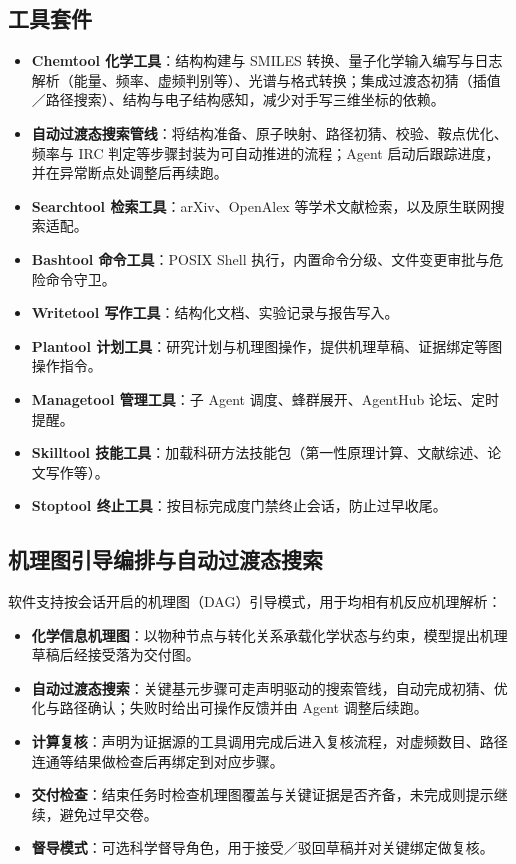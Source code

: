 \documentclass[zihao=-4,a4paper,fontset=none]{ctexart}
\begin{document}
\subsection{工具套件}
\begin{itemize}[itemsep=2pt]
  \item \textbf{Chemtool 化学工具}：结构构建与 SMILES 转换、量子化学输入编写与日志解析（能量、频率、虚频判别等）、光谱与格式转换；集成过渡态初猜（插值／路径搜索）、结构与电子结构感知，减少对手写三维坐标的依赖。
  \item \textbf{自动过渡态搜索管线}：将结构准备、原子映射、路径初猜、校验、鞍点优化、频率与 IRC 判定等步骤封装为可自动推进的流程；Agent 启动后跟踪进度，并在异常断点处调整后再续跑。
  \item \textbf{Searchtool 检索工具}：arXiv、OpenAlex 等学术文献检索，以及原生联网搜索适配。
  \item \textbf{Bashtool 命令工具}：POSIX Shell 执行，内置命令分级、文件变更审批与危险命令守卫。
  \item \textbf{Writetool 写作工具}：结构化文档、实验记录与报告写入。
  \item \textbf{Plantool 计划工具}：研究计划与机理图操作，提供机理草稿、证据绑定等图操作指令。
  \item \textbf{Managetool 管理工具}：子 Agent 调度、蜂群展开、AgentHub 论坛、定时提醒。
  \item \textbf{Skilltool 技能工具}：加载科研方法技能包（第一性原理计算、文献综述、论文写作等）。
  \item \textbf{Stoptool 终止工具}：按目标完成度门禁终止会话，防止过早收尾。
\end{itemize}

\subsection{机理图引导编排与自动过渡态搜索}
软件支持按会话开启的机理图（DAG）引导模式，用于均相有机反应机理解析：
\begin{itemize}[itemsep=2pt]
  \item \textbf{化学信息机理图}：以物种节点与转化关系承载化学状态与约束，模型提出机理草稿后经接受落为交付图。
  \item \textbf{自动过渡态搜索}：关键基元步骤可走声明驱动的搜索管线，自动完成初猜、优化与路径确认；失败时给出可操作反馈并由 Agent 调整后续跑。
  \item \textbf{计算复核}：声明为证据源的工具调用完成后进入复核流程，对虚频数目、路径连通等结果做检查后再绑定到对应步骤。
  \item \textbf{交付检查}：结束任务时检查机理图覆盖与关键证据是否齐备，未完成则提示继续，避免过早交卷。
  \item \textbf{督导模式}：可选科学督导角色，用于接受／驳回草稿并对关键绑定做复核。
\end{itemize}
\end{document}

